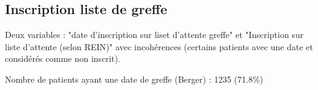 \documentclass[11pt,a4paper]{article}\usepackage[]{graphicx}\usepackage[]{color}
\begin{document}
% 

  \subsection{Inscription liste de greffe}

Deux variables : "date d'inscription sur liset d'attente greffe" et "Inscription sur liste d'attente (selon REIN)" avec incohérences (certains patients avec une date et considérés comme non inscrit).

Nombre de patients ayant une date de greffe (Berger) : 1235 (71.8\%)
\end{document}
